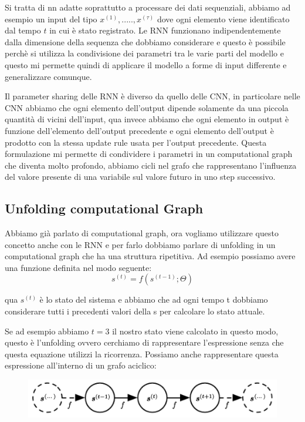 \documentclass[14pt]{extreport}
\begin{document}
Si tratta di nn adatte soprattutto a processare dei dati sequenziali, abbiamo ad esempio un input del tipo $x^{(1)},.....,x^{(\tau)}$ dove ogni elemento viene identificato dal 
tempo $t$ in cui è stato registrato.
Le RNN funzionano indipendentemente dalla dimensione della sequenza che dobbiamo considerare e questo è possibile perchè si utilizza la condivisione dei parametri tra le varie parti del modello e questo
mi permette quindi di applicare il modello a forme di input differente e generalizzare comunque.

Il parameter sharing delle RNN è diverso da quello delle CNN, in particolare nelle CNN abbiamo che ogni elemento dell'output dipende solamente da una piccola quantità di vicini dell'input, 
qua invece abbiamo che ogni elemento in output è funzione dell'elemento dell'output precedente e ogni elemento dell'output è prodotto con la stessa update rule usata per l'output precedente.
Questa formulazione mi permette di condividere i parametri in un computational graph che diventa molto profondo, abbiamo cicli nel grafo che rappresentano l'influenza del valore presente di una variabile sul valore 
futuro in uno step successivo.

\subsection{Unfolding computational Graph}

Abbiamo già parlato di computational graph, ora vogliamo utilizzare questo concetto anche con le RNN e per farlo dobbiamo parlare di unfolding in un computational graph che ha una struttura ripetitiva.
Ad esempio possiamo avere una funzione definita nel modo seguente:
$$s^{(t)} = f(s^{(t-1)}; \Theta)$$

qua $s^{(t)}$ è lo stato del sistema e abbiamo che ad ogni tempo t dobbiamo considerare tutti i precedenti valori della s per calcolare lo stato attuale.

Se ad esempio abbiamo $t=3$ il nostro stato viene calcolato in questo modo, questo è l'unfolding ovvero cerchiamo di rappresentare l'espressione senza che questa equazione utilizzi la ricorrenza.
Possiamo anche rappresentare questa espressione all'interno di un grafo aciclico:

\begin{figure}[H]
	\centering
	\includegraphics[width=0.7\linewidth]{414.jpeg}
	\end{figure}
\end{document}
